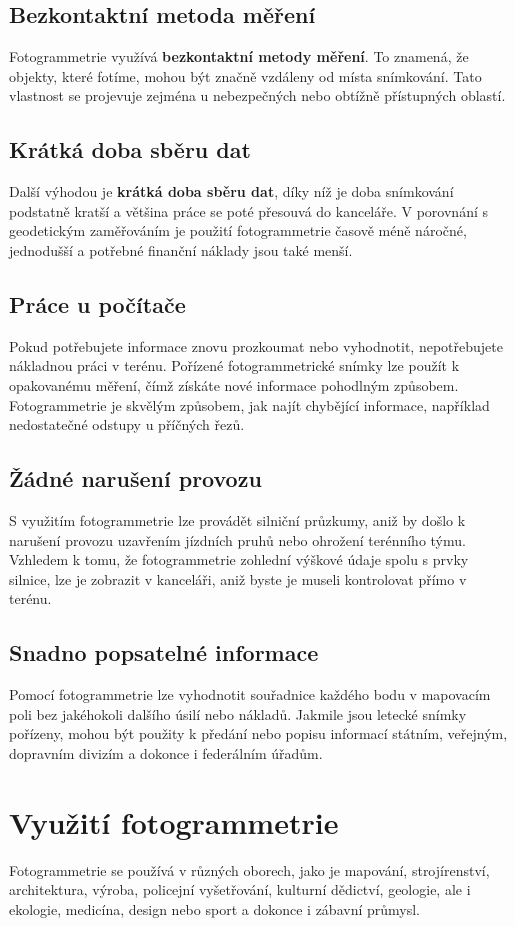 \documentclass[12pt]{report}			%
\begin{document}
            \section{Bezkontaktní metoda měření}
            Fotogrammetrie využívá \textbf{bezkontaktní metody měření}. To znamená, že objekty, které fotíme, mohou být značně vzdáleny od místa snímkování. Tato vlastnost se projevuje zejména u nebezpečných nebo obtížně přístupných oblastí.
            \section{Krátká doba sběru dat}
            Další výhodou je \textbf{krátká doba sběru dat}, díky níž je doba snímkování podstatně kratší a většina práce se poté přesouvá do kanceláře. V porovnání s geodetickým zaměřováním je použití fotogrammetrie časově méně náročné, jednodušší a potřebné finanční náklady jsou také menší.
            \section{Práce u počítače}
            Pokud potřebujete informace znovu prozkoumat nebo vyhodnotit, nepotřebujete nákladnou práci v terénu. Pořízené fotogrammetrické snímky lze použít k opakovanému měření, čímž získáte nové informace pohodlným způsobem. Fotogrammetrie je skvělým způsobem, jak najít chybějící informace, například nedostatečné odstupy u příčných řezů.
            \section{Žádné narušení provozu}
            S využitím fotogrammetrie lze provádět silniční průzkumy, aniž by došlo k narušení provozu uzavřením jízdních pruhů nebo ohrožení terénního týmu. Vzhledem k tomu, že fotogrammetrie zohlední výškové údaje spolu s prvky silnice, lze je zobrazit v kanceláři, aniž byste je museli kontrolovat přímo v terénu.
            \section{Snadno popsatelné informace}
            Pomocí fotogrammetrie lze vyhodnotit souřadnice každého bodu v mapovacím poli bez jakéhokoli dalšího úsilí nebo nákladů. Jakmile jsou letecké snímky pořízeny, mohou být použity k předání nebo popisu informací státním, veřejným, dopravním divizím a dokonce i federálním úřadům.
        \chapter{Využití fotogrammetrie}
        Fotogrammetrie se používá v různých oborech, jako je mapování, strojírenství, architektura, výroba, policejní vyšetřování, kulturní dědictví, geologie, ale i ekologie, medicína, design nebo sport a dokonce i zábavní průmysl.
\end{document}
